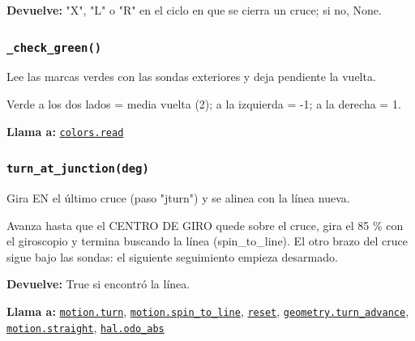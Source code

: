 \par{}\par\smallskip
\noindent\textbf{Devuelve:} "X", "L" o "R" en el ciclo en que se cierra un cruce; si no, None.\par

\subsubsection{\texttt{\_\allowbreak{}check\_\allowbreak{}green()}}\label{fn:linefollow:-check-green}
\noindent Lee las marcas verdes con las sondas exteriores y deja pendiente la vuelta.

Verde a los dos lados = media vuelta (2); a la izquierda = -1; a la derecha = 1.

\noindent\textbf{Llama a:} \hyperref[fn:colors:read]{\texttt{colors.read}}\par

\subsubsection{\texttt{turn\_\allowbreak{}at\_\allowbreak{}junction(deg)}}\label{fn:linefollow:turn-at-junction}
\noindent Gira EN el último cruce (paso "jturn") y se alinea con la línea nueva.

Avanza hasta que el CENTRO DE GIRO quede sobre el cruce, gira el 85 \% con el giroscopio y termina buscando la línea (spin\_to\_line). El otro brazo del cruce sigue bajo las sondas: el siguiente seguimiento empieza desarmado.

\par{}\par\smallskip
\noindent\textbf{Devuelve:} True si encontró la línea.\par
\noindent\textbf{Llama a:} \hyperref[fn:motion:turn]{\texttt{motion.turn}}, \hyperref[fn:motion:spin-to-line]{\texttt{motion.spin\_\allowbreak{}to\_\allowbreak{}line}}, \hyperref[fn:linefollow:reset]{\texttt{reset}}, \hyperref[fn:geometry:turn-advance]{\texttt{geometry.turn\_\allowbreak{}advance}}, \hyperref[fn:motion:straight]{\texttt{motion.straight}}, \hyperref[fn:hal:odo-abs]{\texttt{hal.odo\_\allowbreak{}abs}}\par

